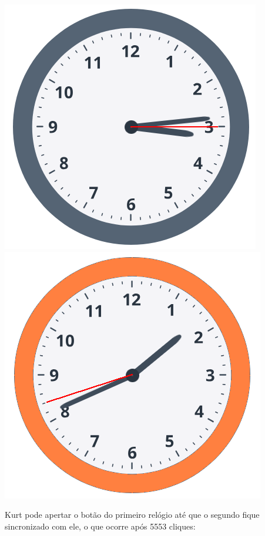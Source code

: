 \includegraphics[scale=0.35]{relogio1.png}
\includegraphics[scale=0.35]{relogio3.png}

Kurt pode apertar o botão do primeiro relógio até que o segundo fique sincronizado com ele, o que ocorre após 5553 cliques:

